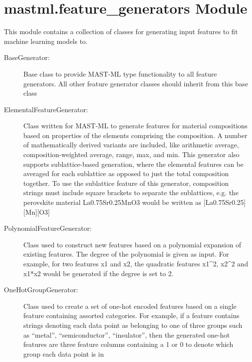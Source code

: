 \documentclass[letterpaper,10pt,english]{sphinxmanual}
\begin{document}
\section{mastml.feature\_generators Module}
\label{\detokenize{5_feature_generators:module-mastml.feature_generators}}\label{\detokenize{5_feature_generators:mastml-feature-generators-module}}
This module contains a collection of classes for generating input features to fit machine learning models to.
\begin{description}
\item[{BaseGenerator:}] \leavevmode
Base class to provide MAST-ML type functionality to all feature generators. All other feature generator classes
should inherit from this base class

\item[{ElementalFeatureGenerator:}] \leavevmode
Class written for MAST-ML to generate features for material compositions based on properties of the elements
comprising the composition. A number of mathematically derived variants are included, like arithmetic average,
composition-weighted average, range, max, and min. This generator also supports sublattice-based generation, where
the elemental features can be averaged for each sublattice as opposed to just the total composition together. To
use the sublattice feature of this generator, composition strings must include square brackets to separate the sublattices,
e.g. the perovskite material La0.75Sr0.25MnO3 would be written as {[}La0.75Sr0.25{]}{[}Mn{]}{[}O3{]}

\item[{PolynomialFeatureGenerator:}] \leavevmode
Class used to construct new features based on a polynomial expansion of existing features. The degree of the
polynomial is given as input. For example, for two features x1 and x2, the quadratic features x1\textasciicircum{}2, x2\textasciicircum{}2 and x1*x2
would be generated if the degree is set to 2.

\item[{OneHotGroupGenerator:}] \leavevmode
Class used to create a set of one-hot encoded features based on a single feature containing assorted categories.
For example, if a feature contains strings denoting each data point as belonging to one of three groups such as
“metal”, “semiconductor”, “insulator”, then the generated one-hot features are three feature columns containing a 1 or
0 to denote which group each data point is in


\end{description}
\end{document}
